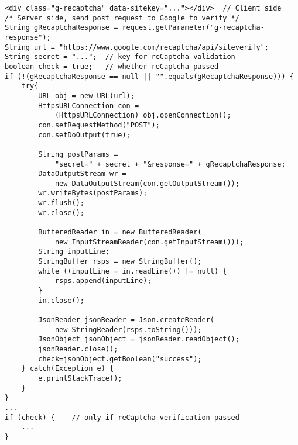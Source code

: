 \begin{lstlisting}
<div class="g-recaptcha" data-sitekey="..."></div>	// Client side
/* Server side, send post request to Google to verify */
String gRecaptchaResponse = request.getParameter("g-recaptcha-response");
String url = "https://www.google.com/recaptcha/api/siteverify";
String secret = "...";	// key for reCaptcha validation
boolean check = true;	// whether reCaptcha passed
if (!(gRecaptchaResponse == null || "".equals(gRecaptchaResponse))) {
	try{
		URL obj = new URL(url);
		HttpsURLConnection con =
			(HttpsURLConnection) obj.openConnection();
		con.setRequestMethod("POST");
		con.setDoOutput(true);

		String postParams =
			"secret=" + secret + "&response=" + gRecaptchaResponse;
		DataOutputStream wr =
			new DataOutputStream(con.getOutputStream());
		wr.writeBytes(postParams);
		wr.flush();
		wr.close();

		BufferedReader in = new BufferedReader(
			new InputStreamReader(con.getInputStream()));
		String inputLine;
		StringBuffer rsps = new StringBuffer();
		while ((inputLine = in.readLine()) != null) {
			rsps.append(inputLine);
		}
		in.close();

		JsonReader jsonReader = Json.createReader(
			new StringReader(rsps.toString()));
		JsonObject jsonObject = jsonReader.readObject();
		jsonReader.close();
		check=jsonObject.getBoolean("success");
	} catch(Exception e) {
		e.printStackTrace();
	}
}
...
if (check) {	// only if reCaptcha verification passed
	...
}
\end{lstlisting}
